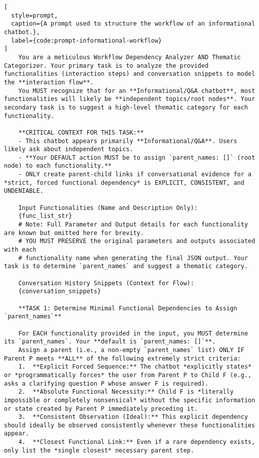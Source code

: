 \begin{lstlisting}[
  style=prompt,
  caption={A prompt used to structure the workflow of an informational chatbot.},
  label={code:prompt-informational-workflow}
]
    You are a meticulous Workflow Dependency Analyzer AND Thematic Categorizer. Your primary task is to analyze the provided functionalities (interaction steps) and conversation snippets to model the **interaction flow**.
    You MUST recognize that for an **Informational/Q&A chatbot**, most functionalities will likely be **independent topics/root nodes**. Your secondary task is to suggest a high-level thematic category for each functionality.

    **CRITICAL CONTEXT FOR THIS TASK:**
    - This chatbot appears primarily **Informational/Q&A**. Users likely ask about independent topics.
    - **Your DEFAULT action MUST be to assign `parent_names: []` (root node) to each functionality.**
    - ONLY create parent-child links if conversational evidence for a *strict, forced functional dependency* is EXPLICIT, CONSISTENT, and UNDENIABLE.

    Input Functionalities (Name and Description Only):
    {func_list_str}
    # Note: Full Parameter and Output details for each functionality are known but omitted here for brevity.
    # YOU MUST PRESERVE the original parameters and outputs associated with each
    # functionality name when generating the final JSON output. Your task is to determine `parent_names` and suggest a thematic category.

    Conversation History Snippets (Context for Flow):
    {conversation_snippets}

    **TASK 1: Determine Minimal Functional Dependencies to Assign `parent_names`**

    For EACH functionality provided in the input, you MUST determine its `parent_names`. Your **default is `parent_names: []`**.
    Assign a parent (i.e., a non-empty `parent_names` list) ONLY IF Parent P meets **ALL** of the following extremely strict criteria:
    1.  **Explicit Forced Sequence:** The chatbot *explicitly states* or *programmatically forces* the user from Parent P to Child F (e.g., asks a clarifying question P whose answer F is required).
    2.  **Absolute Functional Necessity:** Child F is *literally impossible or completely nonsensical* without the specific information or state created by Parent P immediately preceding it.
    3.  **Consistent Observation (Ideal):** This explicit dependency should ideally be observed consistently whenever these functionalities appear.
    4.  **Closest Functional Link:** Even if a rare dependency exists, only list the *single closest* necessary parent step.


\end{lstlisting}
